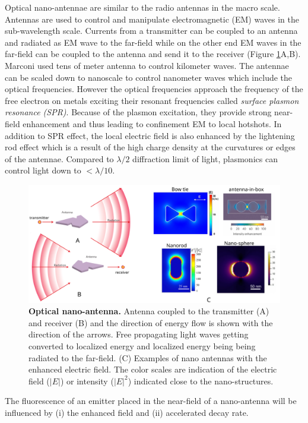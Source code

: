 Optical nano-antennae are similar to the radio antennas in the macro scale.
Antennas are used to control and manipulate electromagnetic (EM) waves in the sub-wavelength scale.
Currents from a transmitter can be coupled to an antenna and radiated as EM wave to the far-field while on the other end EM waves in the far-field can be coupled to the antenna and send it to the receiver (Figure \ref{fig:nano_antenna}A,B).
Marconi used tens of meter antenna to control kilometer waves. 
The antennae can be scaled down to nanoscale to control nanometer waves which include the optical frequencies.
However the optical frequencies approach the frequency of the free electron on metals exciting their resonant frequencies called \textit{surface plasmon resonance (SPR)}.
Because of the plasmon excitation, they provide strong near-field enhancement and thus leading to confinement EM to local hotshots.
In addition to SPR effect, the local electric field is also enhanced by the lightening rod effect which is a result of the high charge density at the curvatures or edges of the antennae.
Compared to $\lambda/2$ diffraction limit of light, plasmonics can control light down to ${<}\lambda/10$.
\begin{figure}
	\centering
	\includegraphics[width=\textwidth]{nano_antenna}
	\caption{\textbf{Optical nano-antenna.} Antenna coupled to the transmitter (A) and receiver (B) and the direction of energy flow is shown with the direction of the arrows.
	Free propagating light waves getting converted to localized energy and localized energy being being radiated to the far-field.
	(C) Examples of nano antennas with the enhanced electric field.
	The color scales are indication of the electric field ($|E|$) or intensity ($|E|^2$) indicated close to the nano-structures.}
	\label{fig:nano_antenna}
\end{figure}
The fluorescence of an emitter placed in the near-field of a nano-antenna will be influenced by (i) the enhanced field and (ii) accelerated decay rate.
